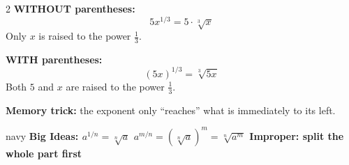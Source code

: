 \documentclass[12pt]{article}
\begin{document}
\vspace{8pt}

\begin{watchbox}
\begin{multicols}{2}
\textbf{WITHOUT parentheses:}
\[
5x^{1/3} = 5\cdot\sqrt[3]{x}
\]
Only $x$ is raised to the power $\tfrac{1}{3}$.

\columnbreak

\textbf{WITH parentheses:}
\[
(5x)^{1/3} = \sqrt[3]{5x}
\]
Both $5$ and $x$ are raised to the power $\tfrac{1}{3}$.
\end{multicols}
\vspace{2pt}
\textbf{Memory trick:} the exponent only ``reaches'' what is immediately to its left.
\end{watchbox}

\vspace{8pt}

\begin{keystrip}{navy}
\color{white}\bfseries
Big Ideas:\quad
$a^{1/n}=\sqrt[n]{a}$
\hspace{16pt}
$a^{m/n}=(\sqrt[n]{a})^m=\sqrt[n]{a^m}$
\hspace{16pt}
Improper: split the whole part first
\end{keystrip}

\newpage

\end{document}
